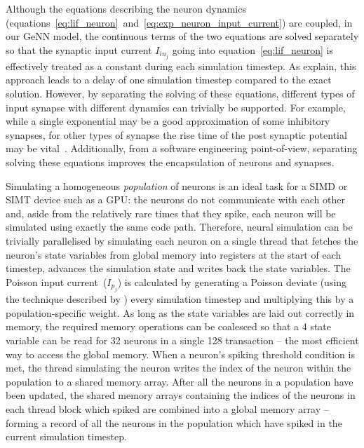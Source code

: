 \documentclass[utf8]{frontiersSCNS} %
\begin{document}
Although the equations describing the neuron dynamics (equations~\ref{eq:lif_neuron}~and~\ref{eq:exp_neuron_input_current}) are coupled, in our GeNN model, the continuous terms of the two equations are solved separately so that the synaptic input current $I_{{in}_{j}}$ going into equation~\ref{eq:lif_neuron} is effectively treated as a constant during each simulation timestep.
As \citet{Rotter1999} explain, this approach leads to a delay of one simulation timestep compared to the exact solution.
However, by separating the solving of these equations, different types of input synapse with different dynamics can trivially be supported.
For example, while a single exponential may be a good approximation of some inhibitory synapses, for other types of synapse the rise time of the post synaptic potential may be vital~\citep{VanVreeswijk1994}.
Additionally, from a software engineering point-of-view, separating solving these equations improves the encapsulation of neurons and synapses.

Simulating a homogeneous \textit{population} of neurons is an ideal task for a SIMD or SIMT device such as a GPU: the neurons do not communicate with each other and, aside from the relatively rare times that they spike, each neuron will be simulated using exactly the same code path.
Therefore, neural simulation can be trivially parallelised by simulating each neuron on a single thread that fetches the neuron's state variables from global memory into registers at the start of each timestep, advances the simulation state and writes back the state variables.
The Poisson input current~($I_{p_{j}}$) is calculated by generating a Poisson deviate (using the technique described by \citet[p504]{DevroyeLuc2013}) every simulation timestep and multiplying this by a population-specific weight.
As long as the state variables are laid out correctly in memory, the required memory operations can be coalesced so that a \SI{4}{\byte} state variable can be read for \num{32} neurons in a single \SI{128}{\byte} transaction -- the most efficient way to access the global memory.
When a neuron's spiking threshold condition is met, the thread simulating the neuron writes the index of the neuron within the population to a shared memory array.
After all the neurons in a population have been updated, the shared memory arrays containing the indices of the neurons in each thread block which spiked are combined into a global memory array -- forming a record of all the neurons in the population which have spiked in the current simulation timestep.
\end{document}
